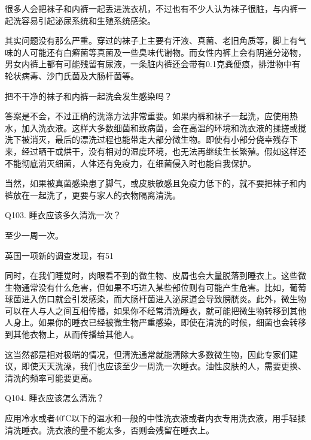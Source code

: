 \documentclass[12pt,UTF8]{ctexbook}
\begin{document}
很多人会把袜子和内裤一起丢进洗衣机，不过也有不少人认为袜子很脏，与内裤一起洗容易引起泌尿系统和生殖系统感染。

其实问题没有那么严重。穿过的袜子上主要有汗液、真菌、老旧角质等，脚上有气味的人可能还有白癣菌等真菌及一些臭味代谢物。而女性内裤上会有阴道分泌物，男女内裤上都有可能残留有尿液，一条脏内裤还会带有0.1克粪便痕，排泄物中有轮状病毒、沙门氏菌及大肠杆菌等。

把不干净的袜子和内裤一起洗会发生感染吗？

答案是不会，不过正确的洗涤方法非常重要。如果内裤和袜子一起洗，应使用热水，加入洗衣液。这样大多数细菌和致病菌，会在高温的环境和洗衣液的揉搓或搅洗下被消灭，最后的漂洗过程也能带走大部分微生物。即使有小部分侥幸残存下来，经过晒干或烘干，没有相对的湿度环境，也无法再继续生长繁殖。假如这样还不能彻底消灭细菌，人体还有免疫力，在细菌侵入时也能自我保护。

当然，如果被真菌感染患了脚气，或皮肤敏感且免疫力低下的，就不要把袜子和内裤放在一起洗了，更要与家人的衣物隔离清洗。





Q103. 睡衣应该多久清洗一次？


至少一周一次。

英国一项新的调查发现，有51%

同时，在我们睡觉时，肉眼看不到的微生物、皮屑也会大量脱落到睡衣上。这些微生物通常没有什么危害，但如果不巧进入某些部位则有可能产生危害。比如，葡萄球菌进入伤口就会引发感染，而大肠杆菌进入泌尿道会导致膀胱炎。此外，微生物可以在人与人之间互相传播，如果你不经常清洗睡衣，就可能把微生物转移到其他人身上。如果你的睡衣已经被微生物严重感染，即使在清洗的时候，细菌也会转移到其他衣物上，从而传播给其他人。

这当然都是相对极端的情况，但清洗通常就能清除大多数微生物，因此专家们建议，即使天天洗澡，我们也应该至少一周洗一次睡衣。油性皮肤的人，需要更换、清洗的频率可能要更高。





Q104. 睡衣应该怎么清洗？


应用冷水或者40℃以下的温水和一般的中性洗衣液或者内衣专用洗衣液，用手轻揉清洗睡衣。洗衣液的量不能太多，否则会残留在睡衣上。
\end{document}
